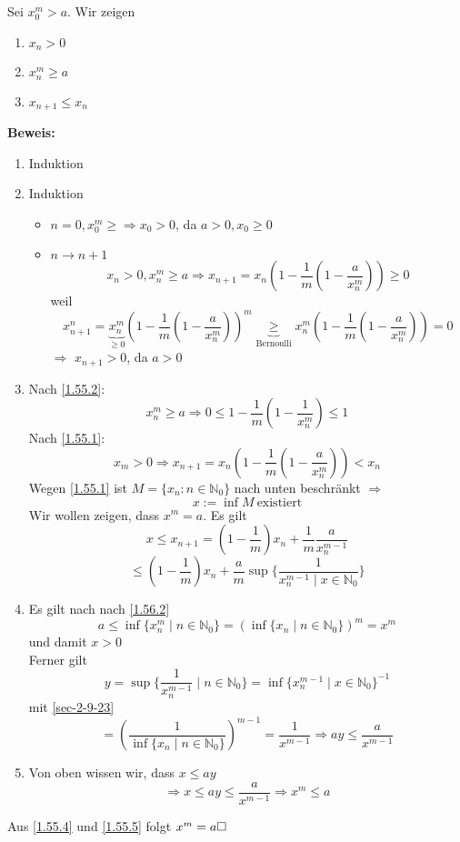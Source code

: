 \documentclass[a4paper]{scrartcl}
\begin{document}
Sei $x_0^m > a$. Wir zeigen
\begin{enumerate}
\item \label{1.55.1} $x_n > 0$
\item \label{1.55.2} $x_n^m \geq a$
\item $x_{n + 1} \leq x_n$
\end{enumerate}
\textbf{Beweis:}
\begin{enumerate}
\item Induktion
\item Induktion
\begin{itemize}
\item $n = 0, x_0^m \geq \Rightarrow x_0 > 0$, da $a > 0,x_0\geq 0$
\item $n\to n + 1$ \[x_n > 0, x_n^m\geq a \Rightarrow x_{n + 1} = x_n(1 - \frac{1}{m}(1 - \frac{a}{x_n^m})) \geq 0\]
          weil \[x_{n + 1}^n = \underbrace{x_n^m}_{\geq 0} (1 - \frac{1}{m}(1 - \frac{a}{x_n^m}))^m \underbrace{\geq}_{\text{Bernoulli}} x_n^m(1 - \frac{1}{m}(1 - \frac{a}{x_n^m}))  = 0\]
          $\Rightarrow$ $x_{n + 1} > 0$, da $a > 0$
\end{itemize}
\item Nach \ref{1.55.2}: \[x_n^m \geq a \Rightarrow 0 \leq 1 - \frac{1}{m}(1 - \frac{1}{x_n^m}) \leq 1\]
        Nach \ref{1.55.1}: \[x_m > 0 \Rightarrow x_{n + 1} = x_n(1 - \frac{1}{m}(1-\frac{a}{x_n^m})) < x_n\]
        Wegen \ref{1.55.1} ist $M = \{x_n:n\in\mathbb{N}_0\}$ nach unten beschränkt $\Rightarrow$
        \[x:= \inf M~\text{existiert}\]
        Wir wollen zeigen, dass $x^m = a$. Es gilt \[x \leq x_{n + 1} = (1 - \frac{1}{m})x_n + \frac{1}{m}\frac{a}{x^{m -1}_n}\]
        \[\leq (1 - \frac{1}{m})x_n + \frac{a}{m}\sup \{\frac{1}{x_n^{m - 1}\mid x\in\mathbb{N}_0}\} \]
\item \label{1.55.4} Es gilt nach nach \ref{1.56.2}
\[a\leq \inf \{x_n^m \mid n\in \mathbb{N}_0\} = (\inf \{x_n \mid n\in \mathbb{N}_0\})^m = x^m\]
und damit $x > 0$ \\
        Ferner gilt
\[y = \sup \{\frac{1}{x_n^{m - 1}} \mid n\in\mathbb{N}_0\} = \inf \{x_n^{m - 1}\mid x \in \mathbb{N}_0\}^{-1}\]
mit \ref{sec-2-9-23} \[= (\frac{1}{\inf\{x_n \mid n\in\mathbb{N}_0\}})^{m - 1} = \frac{1}{x^{m -1}} \Rightarrow a y\leq \frac{a}{x^{m - 1}}\]
\item \label{1.55.5} Von oben wissen wir, dass $x \leq a y$
        \[\Rightarrow x\leq a y  \leq \frac{a}{x^{m -1}} \Rightarrow x^m \leq a\]
\end{enumerate}

Aus \ref{1.55.4} und \ref{1.55.5} folgt $x^m = a\hfill\square$
\end{document}
